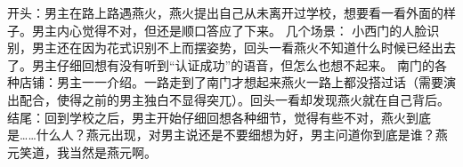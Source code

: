 开头：男主在路上路遇燕火，燕火提出自己从未离开过学校，想要看一看外面的样子。男主内心觉得不对，但还是顺口答应了下来。
几个场景：
小西门的人脸识别，男主还在因为花式识别不上而摆姿势，回头一看燕火不知道什么时候已经出去了。男主仔细回想有没有听到“认证成功”的语音，但怎么也想不起来。
	南门的各种店铺：男主一一介绍。一路走到了南门才想起来燕火一路上都没搭过话（需要演出配合，使得之前的男主独白不显得突兀）。回头一看却发现燕火就在自己背后。
结尾：回到学校之后，男主开始仔细回想各种细节，觉得有些不对，燕火到底是……什么人？燕元出现，对男主说还是不要细想为好，男主问道你到底是谁？燕元笑道，我当然是燕元啊。
